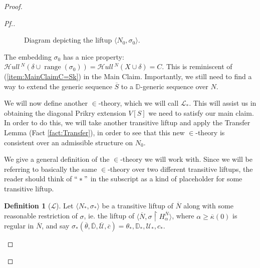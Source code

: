 \documentclass{amsart}
\theoremstyle{definition}
\newtheorem{definition}[theorem]{Definition}
\theoremstyle{remark}
\newcommand{\D}{\mathbb{D}}
\newcommand{\N}{{\overline{N}}}
\renewcommand{\S}{{\overline{S}}}
\newcommand{\U}{\mathcal{U}}
\DeclareMathOperator{\ran}{range}
\newcommand{\rest}{\mathbin{\upharpoonright}}
\newcommand{\SH}{\mathcal{H}\textit{ull} \,}
\newcommand{\sk}[3]{\SH^{#1}( {#2} \cup {\ran(#3)} ) }
\newcommand{\Sk}[3]{\SH^{#1}( {#2} \cup {#3} ) }
\begin{document}
\begin{proof}
\begin{proof}[Pf.]
\begin{figure}[h!]
 \caption{Diagram depicting the liftup $\langle N_0, \sigma_0\rangle$.} \label{figure:N0N}
\end{figure}

The embedding $\sigma_0$ has a nice property: $\sk{N}{\delta}{\sigma_0}=\Sk{N}{X}{\delta}= C.$ This is reminiscent of (\ref{item:MainClaimC=Sk}) in the Main Claim. 
Importantly, we still need to find a way to extend the generic sequence $\S$ to a $\D$-generic sequence over $N$. 

We will now define another $\in$-theory, which we will call $\mathcal L_*$. 
This will assist us in obtaining the diagonal Prikry extension $V[S]$ we need to satisfy our main claim. In order to do this, we will take another transitive liftup and apply the Transfer Lemma (Fact \ref{fact:Transfer}), in order to see that this new $\in$-theory is consistent over an admissible structure on $N_0$. 

We give a general definition of the $\in$-theory we will work with. Since we will be referring to basically the same $\in$-theory over two different transitive liftups, the reader should think of $``*"$ in the subscript as a kind of placeholder for some transitive liftup.



\begin{definition}[$\mathcal L$] \label{definition:L} Let $\langle N_*, \sigma_* \rangle$ be a transitive liftup of $\N$ along with some reasonable restriction of $\sigma$, ie. the liftup of $\langle \N, \sigma \rest H_{\alpha}^{\N} \rangle$, where $\alpha \geq \overline \kappa(0)$ is regular in $\N$, and say $\sigma_*(\overline \theta, \overline{\D}, \overline{\U}, \overline c) = \theta_*, \D_*, \U_*, c_*.$ 


\end{definition}
\end{proof}
\end{proof}
\end{document}
